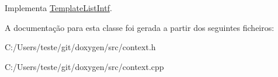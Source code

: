 Implementa \hyperlink{class_template_list_intf_a972208b612df97b9d7216b3a28f0d0c3}{Template\-List\-Intf}.



A documentação para esta classe foi gerada a partir dos seguintes ficheiros\-:\begin{DoxyCompactItemize}
\item 
C\-:/\-Users/teste/git/doxygen/src/context.\-h\item 
C\-:/\-Users/teste/git/doxygen/src/context.\-cpp\end{DoxyCompactItemize}
